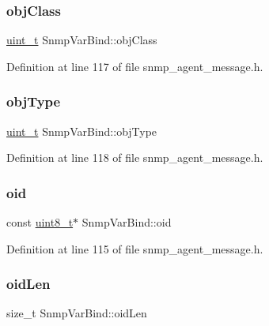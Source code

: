 \subsubsection{\texorpdfstring{obj\+Class}{objClass}}
{\footnotesize\ttfamily \hyperlink{compiler__port_8h_a12a1e9b3ce141648783a82445d02b58d}{uint\+\_\+t} Snmp\+Var\+Bind\+::obj\+Class}



Definition at line 117 of file snmp\+\_\+agent\+\_\+message.\+h.

\mbox{\label{structSnmpVarBind_afdac7f883345297a480ccc1f10f7fa59}} 
\subsubsection{\texorpdfstring{obj\+Type}{objType}}
{\footnotesize\ttfamily \hyperlink{compiler__port_8h_a12a1e9b3ce141648783a82445d02b58d}{uint\+\_\+t} Snmp\+Var\+Bind\+::obj\+Type}



Definition at line 118 of file snmp\+\_\+agent\+\_\+message.\+h.

\mbox{\label{structSnmpVarBind_a04320e45559a3eb7c9855714f5b513cf}} 
\subsubsection{\texorpdfstring{oid}{oid}}
{\footnotesize\ttfamily const \hyperlink{stdint_8h_aba7bc1797add20fe3efdf37ced1182c5}{uint8\+\_\+t}$\ast$ Snmp\+Var\+Bind\+::oid}



Definition at line 115 of file snmp\+\_\+agent\+\_\+message.\+h.

\mbox{\label{structSnmpVarBind_a503daac7f1d394bfcdba2d5edadfe65e}} 
\subsubsection{\texorpdfstring{oid\+Len}{oidLen}}
{\footnotesize\ttfamily size\+\_\+t Snmp\+Var\+Bind\+::oid\+Len}



